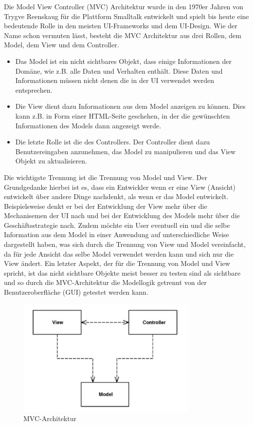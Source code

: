Die Model View Controller (MVC) Architektur wurde in den 1970er Jahren von Trygve Reenskaug für die Plattform Smalltalk entwickelt und spielt bis heute eine bedeutende Rolle in den meisten UI-Frameworks und dem UI-Design.
Wie der Name schon vermuten lässt, besteht die MVC Architektur aus drei Rollen, dem Model, dem View und dem Controller.
\begin{itemize}
\item Das Model ist ein nicht sichtbares Objekt, dass einige Informationen der Domäne, wie z.B. alle Daten und Verhalten enthält. Diese Daten und Informationen müssen nicht denen die in der UI verwendet werden entsprechen.

\item Die View dient dazu Informationen aus dem Model anzeigen zu können. Dies kann z.B. in Form einer HTML-Seite geschehen, in der die gewünschten Informationen des Models dann angezeigt werde.

\item Die letzte Rolle ist die des Controllers. Der Controller dient dazu Benutzereingaben anzunehmen, das Model zu manipulieren und das View Objekt zu aktualisieren.
\end{itemize}
Die wichtigste Trennung ist die Trennung von Model und View. Der Grundgedanke hierbei ist es, dass ein Entwickler wenn er eine View (Ansicht) entwickelt über andere Dinge nachdenkt, als wenn er das Model entwickelt. Beispielsweise denkt er bei der Entwicklung der View mehr über die Mechanisemen der UI nach und bei der Entwicklung des Models mehr über die Geschäftsstrategie nach. Zudem möchte ein User eventuell ein und die selbe Information aus dem Model in einer Anwendung auf unterschiedliche Weise dargestellt haben, was sich durch die Trennung von View und Model vereinfacht, da für jede Ansicht das selbe Model verwendet werden kann und sich nur die View ändert. Ein letzter Aspekt, der für die Trennung von Model und View spricht, ist das nicht sichtbare Objekte meist besser zu testen sind als sichtbare und so durch die MVC-Architektur die Modellogik getrennt von der Benutzeroberfläche (GUI) getestet werden kann.
\begin{figure}[H]
\centering
\includegraphics[width=0.80\textwidth]{img/MVC-Allgemein(Fowler).png}
\caption {MVC-Architektur}
\end{figure}
